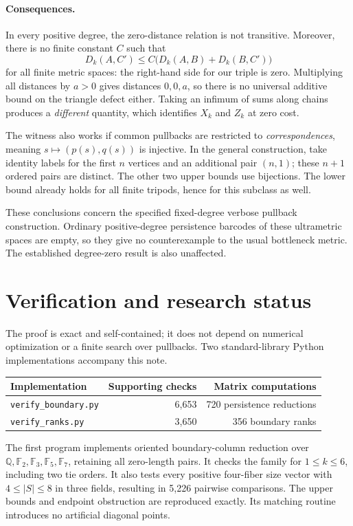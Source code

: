 \documentclass[11pt]{article}
\theoremstyle{remark}
\begin{document}
\paragraph{Consequences.}
In every positive degree, the zero-distance relation is not transitive.
Moreover, there is no finite constant $C$ such that
\[
D_k(A,C')\le C\bigl(D_k(A,B)+D_k(B,C')\bigr)
\]
for all finite metric spaces: the right-hand side for our triple is zero.
Multiplying all distances by $a>0$ gives distances $0,0,a$, so there is
no universal additive bound on the triangle defect either.
Taking an infimum of sums along chains produces a \emph{different}
quantity, which identifies $X_k$ and $Z_k$ at zero cost.

The witness also works if common pullbacks are restricted to
\emph{correspondences}, meaning $s\mapsto(p(s),q(s))$ is injective.
In the general construction, take identity labels for the first $n$
vertices and an additional pair $(n,1)$; these $n+1$ ordered pairs are
distinct. The other two upper bounds use bijections. The lower bound
already holds for all finite tripods, hence for this subclass as well.

These conclusions concern the specified fixed-degree verbose pullback
construction. Ordinary positive-degree persistence barcodes of these
ultrametric spaces are empty, so they give no counterexample to the usual
bottleneck metric. The established degree-zero result is also unaffected.

\section{Verification and research status}
The proof is exact and self-contained; it does not depend on numerical
optimization or a finite search over pullbacks. Two standard-library
Python implementations accompany this note.

\begin{center}
\begin{tabular}{@{}lrr@{}}\toprule
Implementation & Supporting checks & Matrix computations\\\midrule
\texttt{verify\_boundary.py} & 6,653 & 720 persistence reductions\\
\texttt{verify\_ranks.py} & 3,650 & 356 boundary ranks\\\bottomrule
\end{tabular}
\end{center}

The first program implements oriented boundary-column reduction over
$\mathbb Q,\mathbb F_2,\mathbb F_3,\mathbb F_5,\mathbb F_7$, retaining
all zero-length pairs. It checks the family for $1\le k\le6$, including
two tie orders. It also tests every positive four-fiber size vector with
$4\le |S|\le8$ in three fields, resulting in 5,226 pairwise comparisons.
The upper bounds and endpoint obstruction are reproduced exactly.
Its matching routine introduces no artificial diagonal points.
\end{document}
